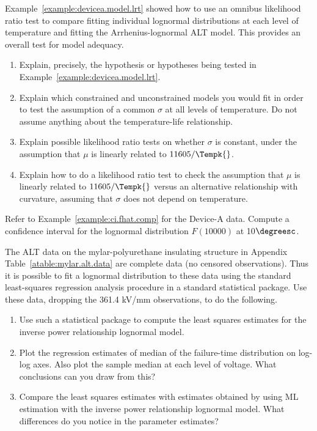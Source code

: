 \begin{exercise}
Example~\ref{example:devicea.model.lrt} showed how to use an omnibus
likelihood ratio test to compare fitting individual lognormal
distributions at each level of temperature and fitting the
Arrhenius-lognormal ALT model.  This provides an overall test for
model adequacy.
\begin{enumerate}
\item
Explain, precisely, the hypothesis or hypotheses being tested in
Example~\ref{example:devicea.model.lrt}.
\item
Explain which constrained and unconstrained models you would
fit in order to test the assumption of a common $\sigma$ at all
levels of temperature. Do not assume anything about the
temperature-life relationship.
\item
Explain possible likelihood ratio tests on whether $\sigma$ is
constant, under the assumption that $\mu$ is linearly related to
$11605/\Tempk{}$.
\item
Explain how to do a likelihood ratio test to check the assumption
that $\mu$ is linearly related to $11605/\Tempk{}$ versus an
alternative relationship with curvature, assuming that $\sigma$ does
not depend on temperature.
\end{enumerate}
\end{exercise}


\begin{exercise}
Refer to Example~\ref{example:ci.fhat.comp} for the Device-A data.
Compute a confidence interval for the lognormal distribution
$F(10000)$ at 10$\degreesc$.
\end{exercise}



\begin{exercise}
\label{exercise:mylar.lognormal}
The ALT data on the mylar-polyurethane insulating structure in
Appendix Table~\ref{atable:mylar.alt.data} are complete data (no
censored observations). Thus it is possible to fit a lognormal
distribution to these data using the standard least-squares regression
analysis procedure in a standard statistical package.
Use these data, dropping the 361.4 kV/mm observations, to do the following.
\begin{enumerate}
\item
Use such a statistical package to compute the least squares estimates for
the inverse power relationship lognormal model.
\item
Plot the regression estimates of median of the failure-time
distribution on log-log axes. Also plot the sample median at each
level of voltage. What conclusions can you draw from this?
\item
Compare the least squares estimates with estimates obtained by using
ML estimation with the inverse power relationship lognormal
model. What differences do you notice in the parameter estimates?
\end{enumerate}
\end{exercise}

